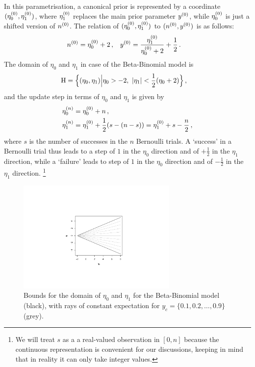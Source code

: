 In this parametrisation, a canonical prior is represented by a coordinate $(\eta_0^{(0)},\eta_1^{(0)})$,
where $\eta_1^{(0)}$ replaces the main prior parameter $y^{(0)}$,
while $\eta_0^{(0)}$ is just a shifted version of $n^{(0)}$.
The relation of $(\eta_0^{(0)},\eta_1^{(0)})$ to $(n^{(0)}, y^{(0)})$ is as follows:
\begin{align}
\label{eq:trafotony}
n^{(0)} &= \eta_0^{(0)} + 2\,, &
y^{(0)} &= \frac{\eta_1^{(0)}}{\eta_0^{(0)} + 2} + \frac{1}{2}\,.
\end{align}
The domain of $\eta_0$ and $\eta_1$ in case of the Beta-Binomial model is
\begin{align}
\label{eq:eta-domain}
\mathrm{H} &= \Big\{ (\eta_0,\eta_1) \Big| \eta_0 > -2,\ |\eta_1| < \frac{1}{2}(\eta_0 + 2) \Big.\Big\}\,,
\end{align}
and the update step in terms of $\eta_0$ and $\eta_1$ is given by
\begin{equation}
\label{eq:eta-update}
\begin{aligned}
\eta_0^{(n)} &= \eta_0^{(0)} + n\,, \\
\eta_1^{(n)} &= \eta_1^{(0)} + \frac{1}{2}(s - (n-s)) = \eta_1^{(0)} + s - \frac{n}{2}\,,
\end{aligned}
\end{equation}
where $s$ is the number of successes in the $n$ Bernoulli trials.
A `success' in a Bernoulli trial thus
leads to a step of $1$ in the $\eta_0$ direction and of $+\frac{1}{2}$ in the $\eta_1$ direction,
while a `failure'
leads to step of $1$ in the $\eta_0$ direction and of $-\frac{1}{2}$ in the $\eta_1$ direction.%
\footnote{We will treat $s$ as a a real-valued observation in $[0,n]$
because the continuous representation is convenient for our discussions,
keeping in mind that in reality it can only take integer values.}

\begin{figure}  %
\centering
\includegraphics[trim = 80mm 45mm 80mm 60mm, clip, width=0.7\textwidth]{R/boatshape-domain}%
\caption[Bounds for the domain of $\eta_0$ and $\eta_1$ for the Beta-Binomial model,
with rays of constant expectation for $y_c = \{0.1,0.2,\ldots,0.9\}$.]%
{Bounds for the domain of $\eta_0$ and $\eta_1$ for the Beta-Binomial model (black),
with rays of constant expectation for $y_c = \{0.1,0.2,\ldots,0.9\}$ (grey).}
\label{fig:boatshape-domain}
\end{figure}

